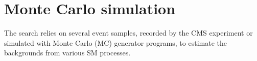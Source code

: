 %
%


\section{Monte Carlo simulation}
\label{sec:simulation}

The search relies on several event samples, recorded by the CMS
experiment or simulated with Monte Carlo (MC) generator programs, to
estimate the backgrounds from various SM processes.

